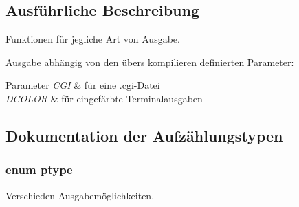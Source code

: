 \subsection{Ausführliche Beschreibung}
Funktionen für jegliche Art von Ausgabe. 

Ausgabe abhängig von den übers kompilieren definierten Parameter\+: 
\begin{DoxyParams}{Parameter}
{\em C\+GI} & für eine .cgi-\/\+Datei \\
\hline
{\em D\+C\+O\+L\+OR} & für eingefärbte Terminalausgaben \\
\hline
\end{DoxyParams}


\subsection{Dokumentation der Aufzählungstypen}
\subsubsection[{\texorpdfstring{ptype}{ptype}}]{\setlength{\rightskip}{0pt plus 5cm}enum {\bf ptype}}\hypertarget{group___lend_lib_out_ga0916607956575302a93dbd21440edc1a}{}\label{group___lend_lib_out_ga0916607956575302a93dbd21440edc1a}


Verschieden Ausgabemöglichkeiten. 

